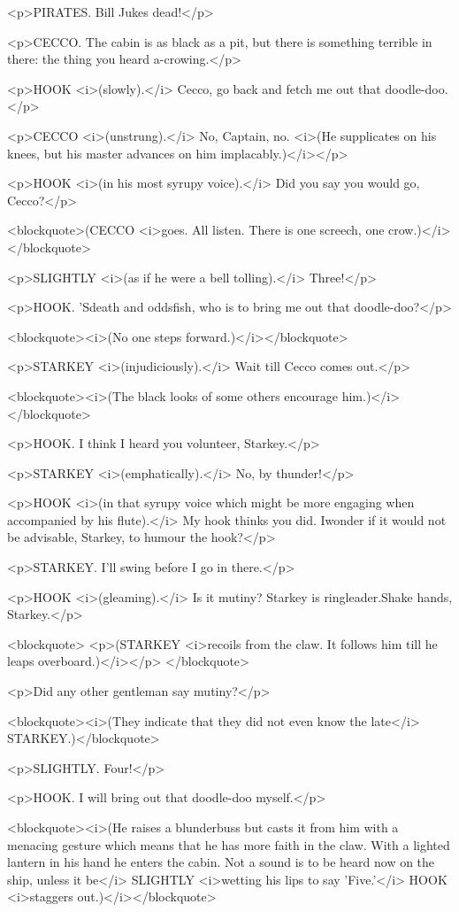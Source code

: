 <p>PIRATES. Bill Jukes dead!</p>

<p>CECCO. The cabin is as black as a pit, but there is something terrible in there: the thing you heard a-crowing.</p>

<p>HOOK <i>(slowly).</i> Cecco, go back and fetch me out that doodle-doo.</p>

<p>CECCO <i>(unstrung).</i> No, Captain, no. <i>(He supplicates on his knees, but his master advances on him implacably.)</i></p>

<p>HOOK <i>(in his most syrupy voice).</i> Did you say you would go, Cecco?</p>

<blockquote>(CECCO <i>goes. All listen. There is one screech, one crow.)</i></blockquote>

<p>SLIGHTLY <i>(as if he were a bell tolling).</i> Three!</p>

<p>HOOK. 'Sdeath and oddsfish, who is to bring me out that doodle-doo?</p>

<blockquote><i>(No one steps forward.)</i></blockquote>

<p>STARKEY <i>(injudiciously).</i> Wait till Cecco comes out.</p>

<blockquote><i>(The black looks of some others encourage him.)</i></blockquote>

<p>HOOK. I think I heard you volunteer, Starkey.</p>

<p>STARKEY <i>(emphatically).</i> No, by thunder!</p>

<p>HOOK <i>(in that syrupy voice which might be more engaging when accompanied by his flute).</i> My hook thinks you did. Iwonder if it would not be advisable, Starkey, to humour the hook?</p>

<p>STARKEY. I'll swing before I go in there.</p>

<p>HOOK <i>(gleaming).</i> Is it mutiny? Starkey is ringleader.Shake hands, Starkey.</p>

<blockquote> <p>(STARKEY <i>recoils from the claw. It follows him till he leaps overboard.)</i></p> </blockquote>

<p>Did any other gentleman say mutiny?</p>

<blockquote><i>(They indicate that they did not even know the late</i> STARKEY.)</blockquote>

<p>SLIGHTLY. Four!</p>

<p>HOOK. I will bring out that doodle-doo myself.</p>

<blockquote><i>(He raises a blunderbuss but casts it from him with a menacing gesture which means that he has more faith in the claw. With a lighted lantern in his hand he enters the cabin. Not a sound is to be heard now on the ship, unless it be</i> SLIGHTLY <i>wetting his lips to say 'Five.'</i> HOOK <i>staggers out.)</i></blockquote>


